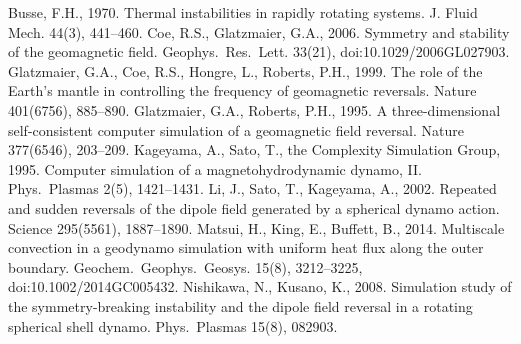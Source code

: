 \begin{thebibliography}{}
%
Busse, F.H., 1970. Thermal instabilities in rapidly rotating systems. J. Fluid Mech. 44(3), 441--460.
%
Coe, R.S., Glatzmaier, G.A., 2006. Symmetry and stability of the geomagnetic field. Geophys.\ Res.\ Lett. 33(21), doi:10.1029/2006GL027903.
%
Glatzmaier, G.A., Coe, R.S., Hongre, L., Roberts, P.H., 1999. The role of the Earth's mantle in controlling the frequency of geomagnetic reversals. Nature 401(6756), 885--890.
%
Glatzmaier, G.A., Roberts, P.H., 1995. A three-dimensional self-consistent computer simulation of a geomagnetic field reversal. Nature 377(6546), 203--209.
%
%
Kageyama, A., Sato, T., the Complexity Simulation Group, 1995. Computer simulation of a magnetohydrodynamic dynamo, II. Phys.\ Plasmas 2(5), 1421--1431.
%
Li, J., Sato, T., Kageyama, A., 2002. Repeated and sudden reversals of the dipole field generated by a spherical dynamo action. Science 295(5561), 1887--1890.
%
%
Matsui, H., King, E., Buffett, B., 2014. Multiscale convection in a geodynamo simulation with uniform heat flux along the outer boundary. Geochem.\ Geophys.\ Geosys. 15(8), 3212--3225, doi:10.1002/2014GC005432.
%
%
Nishikawa, N., Kusano, K., 2008. Simulation study of the symmetry-breaking instability and the dipole field reversal in a rotating spherical shell dynamo. Phys.\ Plasmas 15(8), 082903.
%

\end{thebibliography}
